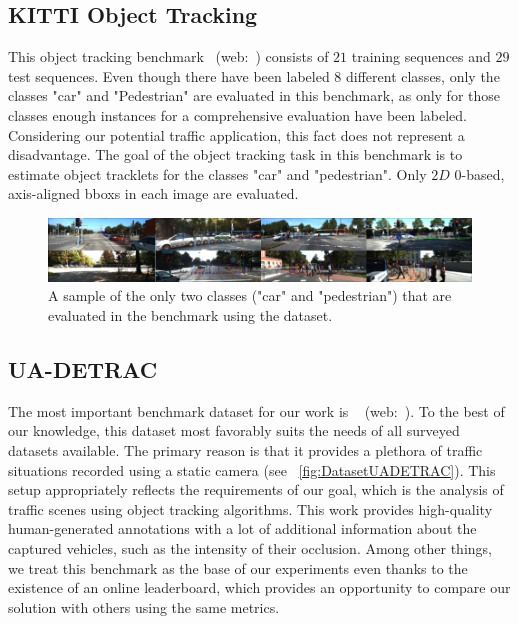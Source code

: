 \subsection{KITTI Object Tracking}
\label{ssec:DatasetKITTIObjectTracking}

This object tracking benchmark~\cite{geiger2012cvpr} (web:~\cite{webkittiobjtrackingdataset}) consists of $21$ training sequences and $29$ test sequences. Even though there have been labeled $8$ different classes, only the classes "car" and "Pedestrian" are evaluated in this benchmark, as only for those classes enough instances for a comprehensive evaluation have been labeled. Considering our potential traffic application, this fact does not represent a disadvantage. The goal of the object tracking task in this benchmark is to estimate object tracklets for the classes "car" and "pedestrian". Only $2D$ $0$-based, axis-aligned \glspl{bbox} in each image are evaluated.

\begin{figure}[t]
    \centerline{\includegraphics[width=\linewidth]{figures/datasets/kitti_object_tracking_sample.jpg}}
    \caption[ dataset]{A sample of the only two classes ("car" and "pedestrian") that are evaluated in the benchmark using the  dataset. }
    \label{fig:DatasetKITTIObjectTracking}
\end{figure}

\subsection{UA-DETRAC}
\label{ssec:DatasetUADETRAC}

The most important benchmark dataset for our work is \uadetrac{}~\cite{wen2020uadetrac} (web:~\cite{webuadetracdataset}). To the best of our knowledge, this dataset most favorably suits the needs of all surveyed datasets available. The primary reason is that it provides a plethora of traffic situations recorded using a static camera (see \figtext{}~\ref{fig:DatasetUADETRAC}). This setup appropriately reflects the requirements of our goal, which is the analysis of traffic scenes using object tracking algorithms. This work provides high-quality human-generated annotations with a lot of additional information about the captured vehicles, such as the intensity of their occlusion. Among other things, we treat this benchmark as the base of our experiments even thanks to the existence of an online leaderboard, which provides an opportunity to compare our solution with others using the same metrics.

